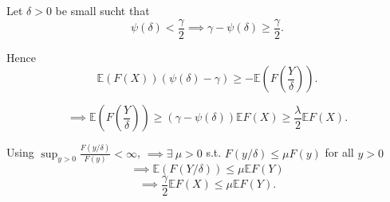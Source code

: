 {    Let $\delta > 0$ be small sucht that 
    $$
    \psi(\delta) < \frac{\gamma}{2} \implies \gamma -\psi(\delta) \geq \frac{\gamma}{2}.
    $$

    Hence 
    $$
    \mathbb{E}\left( F(X) \right)\left( \psi(\delta) - \gamma \right) \geq - \mathbb{E}\left( F\left( \frac{Y}{\delta} \right) \right).
    $$

    $$ \implies
    \mathbb{E}\left( F\left( \frac{Y}{\delta} \right) \right) \geq \left( \gamma - \psi(\delta) \right) \mathbb{E}F(X) \geq \frac{\lambda}{2} \mathbb{E}F(X).
    $$

    Using $\displaystyle\sup_{y > 0}\frac{F(y/\delta)}{F(y)} < \infty$, $\implies \exists~\mu > 0$ s.t. $F(y/\delta) \leq \mu F(y)$ for all $y > 0$ 
    $$\implies \mathbb{E}(F(Y/\delta)) \leq \mu \mathbb{E} F(Y)$$
    $$
    \implies \frac{\gamma}{2}\mathbb{E}F(X) \leq \mu \mathbb{E}F(Y).
    $$
}

